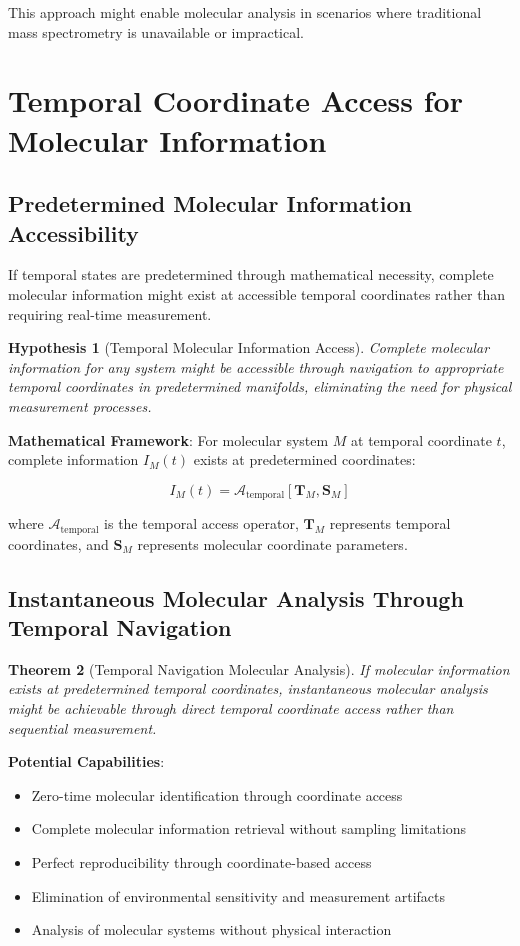 \documentclass[11pt,a4paper]{article}
\newtheorem{theorem}{Theorem}[section]
\newtheorem{hypothesis}[theorem]{Hypothesis}
\theoremstyle{remark}
\begin{document}
This approach might enable molecular analysis in scenarios where traditional mass spectrometry is unavailable or impractical.

\section{Temporal Coordinate Access for Molecular Information}

\subsection{Predetermined Molecular Information Accessibility}

If temporal states are predetermined through mathematical necessity, complete molecular information might exist at accessible temporal coordinates rather than requiring real-time measurement.

\begin{hypothesis}[Temporal Molecular Information Access]
Complete molecular information for any system might be accessible through navigation to appropriate temporal coordinates in predetermined manifolds, eliminating the need for physical measurement processes.
\end{hypothesis}

\textbf{Mathematical Framework}: For molecular system $M$ at temporal coordinate $t$, complete information $I_M(t)$ exists at predetermined coordinates:

$$I_M(t) = \mathcal{A}_{\text{temporal}}[\mathbf{T}_M, \mathbf{S}_M]$$

where $\mathcal{A}_{\text{temporal}}$ is the temporal access operator, $\mathbf{T}_M$ represents temporal coordinates, and $\mathbf{S}_M$ represents molecular coordinate parameters.

\subsection{Instantaneous Molecular Analysis Through Temporal Navigation}

\begin{theorem}[Temporal Navigation Molecular Analysis]
If molecular information exists at predetermined temporal coordinates, instantaneous molecular analysis might be achievable through direct temporal coordinate access rather than sequential measurement.
\end{theorem}

\textbf{Potential Capabilities}:
\begin{itemize}
\item Zero-time molecular identification through coordinate access
\item Complete molecular information retrieval without sampling limitations
\item Perfect reproducibility through coordinate-based access
\item Elimination of environmental sensitivity and measurement artifacts
\item Analysis of molecular systems without physical interaction
\end{itemize}
\end{document}
